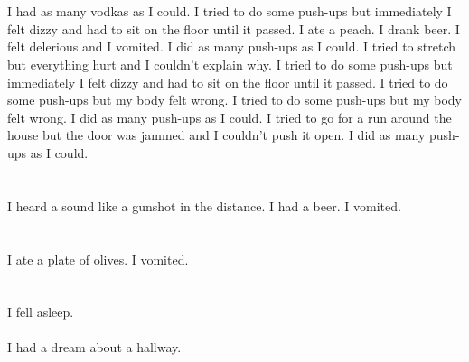 \documentclass{article}
\begin{document}
    \section{}
    I had as many vodkas as I could. I tried to do some push-ups but immediately I felt dizzy and had to sit on the floor until it passed. I ate a peach. I drank beer. I felt delerious and I vomited.  I did as many push-ups as I could.  I tried to stretch but everything hurt and I couldn't explain why.  I tried to do some push-ups but immediately I felt dizzy and had to sit on the floor until it passed.  I tried to do some push-ups but my body felt wrong.   I tried to do some push-ups but my body felt wrong.  I did as many push-ups as I could.  I tried to go for a run around the house but the door was jammed and I couldn't push it open.  I did as many push-ups as I could.  
    \newpage
    
    \section{}
    I heard a sound like a gunshot in the distance. I had a beer. I vomited.  
    \newpage
    
    \section{}
    I ate a plate of olives. I vomited.  
    \newpage
    
    \section{}
    I fell asleep.\\\\I had a dream about a hallway.\\\\ 
    \newpage
    
\end{document}
